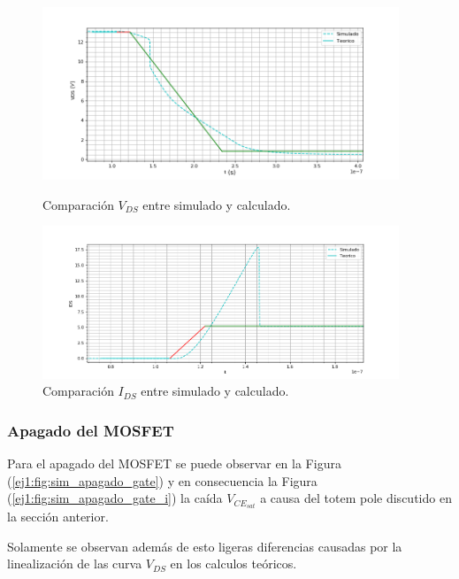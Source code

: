 \begin{figure}[H]
	\centering
	\begin{minipage}{0.45\textwidth}
		\centering
		\includegraphics[width=0.95\textwidth]{ImagenesEjercicio-1/sim_encendido_drain} %
		\caption{Comparación $V_{DS}$ entre simulado y calculado.}
		\label{ej1:fig:sim_encendido_drain}
	\end{minipage}\hfill
	\begin{minipage}{0.45\textwidth}
		\centering
		\includegraphics[width=0.95\textwidth]{ImagenesEjercicio-1/sim_encendido_drain_i} %
		\caption{Comparación $I_{DS}$ entre simulado y calculado.}
		\label{ej1:fig:sim_encendido_drain_i}
	\end{minipage}
\end{figure}

\subsubsection{Apagado del MOSFET}

Para el apagado del MOSFET se puede observar en la Figura (\ref{ej1:fig:sim_apagado_gate}) y en consecuencia la Figura (\ref{ej1:fig:sim_apagado_gate_i}) la caída $V_{CE_{sat}}$ a causa del totem pole discutido en la sección anterior.

Solamente se observan además de esto ligeras diferencias causadas por la linealización de las curva $V_{DS}$ en los calculos teóricos.

